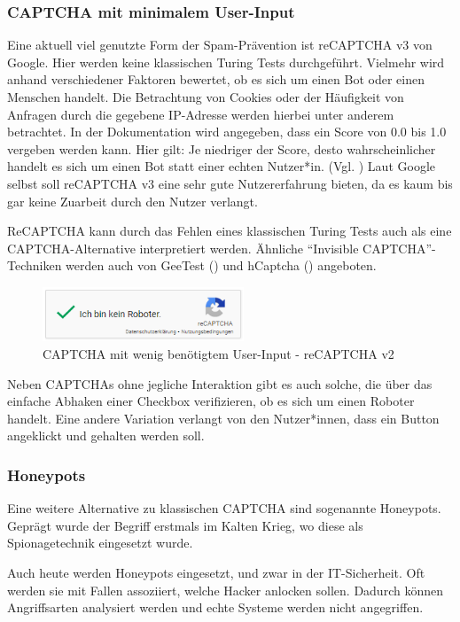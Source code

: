 \subsubsection*{CAPTCHA mit minimalem User-Input}
Eine aktuell viel genutzte Form der Spam-Prävention ist reCAPTCHA v3 von Google. 
Hier werden keine klassischen Turing Tests durchgeführt. 
Vielmehr wird anhand verschiedener Faktoren bewertet, ob es sich um einen Bot oder einen Menschen handelt.
Die Betrachtung von Cookies oder der Häufigkeit von Anfragen durch die gegebene IP-Adresse werden hierbei unter anderem betrachtet.
In der Dokumentation wird angegeben, dass ein Score von 0.0 bis 1.0 vergeben werden kann. 
Hier gilt: Je niedriger der Score, desto wahrscheinlicher handelt es sich um einen Bot statt einer echten Nutzer*in. (Vgl. \cite{recaptchadoc})
Laut Google selbst soll reCAPTCHA v3 eine sehr gute Nutzererfahrung bieten, da es kaum bis gar keine Zuarbeit durch den Nutzer verlangt. \cite{googleblog:recaptcha}

ReCAPTCHA kann durch das Fehlen eines klassischen Turing Tests auch als eine CAPTCHA-Alternative interpretiert werden.
Ähnliche ``Invisible CAPTCHA''-Techniken werden auch von GeeTest (\cite{geetest}) und hCaptcha (\cite{hcaptcha}) angeboten.

\begin{figure}[h!]
    \centering\includegraphics[width=6cm]{gfx/mygraphics/recaptcha.png}
     \caption{CAPTCHA mit wenig benötigtem User-Input - reCAPTCHA v2}
      \label{fig:recaptcha}
\end{figure}

Neben CAPTCHAs ohne jegliche Interaktion gibt es auch solche, 
die über das einfache Abhaken einer Checkbox verifizieren, ob es sich um einen Roboter handelt.
Eine andere Variation verlangt von den Nutzer*innen, dass ein Button angeklickt und gehalten werden soll. 

\subsubsection*{Honeypots}
Eine weitere Alternative zu klassischen CAPTCHA sind sogenannte Honeypots. 
Geprägt wurde der Begriff erstmals im Kalten Krieg, wo diese als Spionagetechnik eingesetzt wurde. \cite[p.2]{joshi:2011} 

Auch heute werden Honeypots eingesetzt, und zwar in der IT-Sicherheit. 
Oft werden sie mit Fallen assoziiert, welche Hacker anlocken sollen. 
Dadurch können Angriffsarten analysiert werden und echte Systeme werden nicht angegriffen.

